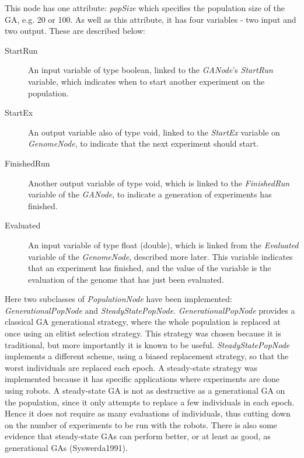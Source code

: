 \documentclass[10pt, notitlepage, a4paper]{article}
\begin{document}
 This node has one attribute: {\it popSize} which specifies the population size of the GA, e.g. 20 or 100.  As well as this attribute, it has four variables - two input and two output. These are described below:
\begin{description}
\item[StartRun] An input variable of type boolean, linked to the {\it GANode}'s {\it StartRun} variable, which indicates when to start another experiment on the population.
\item[StartEx] An output variable also of type void, linked to the {\it StartEx} variable on {\it GenomeNode}, to indicate that the next experiment should start.
\item[FinishedRun] Another output variable of type void, which is linked to the {\it FinishedRun} variable of the {\it GANode}, to indicate a generation of experiments has finished.
\item[Evaluated] An input variable of type float (double), which is linked from the {\it Evaluated} variable of the {\it GenomeNode}, described more later. This variable indicates that an experiment has finished, and the value of the variable is the evaluation of the genome that has just been evaluated.
\end{description}

Here two subclasses of {\it PopulationNode} have been implemented: {\it GenerationalPopNode} and {\it SteadyStatePopNode}. {\it GenerationalPopNode} provides a classical GA generational strategy, where the whole population is replaced at once using an elitist selection strategy. This strategy was chosen because it is traditional, but more importantly it is known to be useful. {\it SteadyStatePopNode} implements a different scheme, using a biased replacement strategy, so that the worst individuals are replaced each epoch. A steady-state strategy was implemented because it has specific applications where experiments are done using robots. A steady-state GA is not as destructive as a generational GA on the population, since it only attempts to replace a few individuals in each epoch. Hence it does not require as many evaluations of individuals, thus cutting down on the number of experiments to be run with the robots. There is also some evidence that steady-state GAs can perform better, or at least as good, as generational GAs (Syswerda1991).
\end{document}

